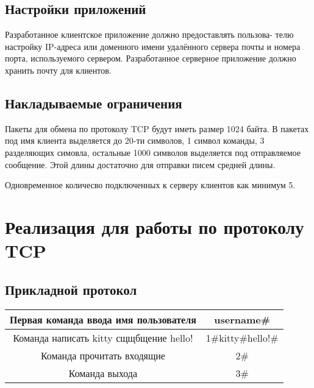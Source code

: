 \documentclass[12pt,a4paper]{report}
\begin{document}
\section{Настройки приложений}
Разработанное клиентское приложение должно предоставлять пользова-
телю настройку IP-адреса или доменного имени удалённого сервера почты и номера порта, используемого сервером. Разработанное серверное
приложение должно хранить почту для клиентов.

\section{Накладываемые ограничения}

Пакеты для обмена по протоколу TCP будут иметь размер 1024 байта. В пакетах под имя клиента выделяется до 20-ти символов, 1 символ команды, 3 разделяющих симовла, остальные 1000 символов выделяется под отправляемое сообщение. Этой длины достаточно для отправки писем средней длины.%


Одновременное количесво подключенных к серверу клиентов как минимум 5.

\chapter{Реализация для работы по протоколу TCP}
\section{Прикладной протокол}
\label{protocol_tcp}
\begin{tabular}{|c|c|}
\hline 
Первая команда ввода имя пользователя & username\# \\ 
\hline 
Команда написать kitty сщщбщение hello! & 1\#kitty\#hello!\# \\ 
\hline 
Команда прочитать входящие & 2\# \\
\hline 
Команда выхода & 3\# \\
\hline 
\end{tabular} 
\end{document}
